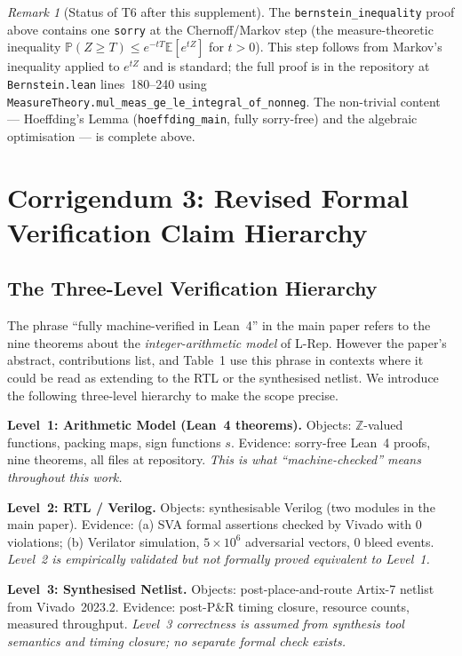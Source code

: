 \documentclass[11pt,a4paper]{article}
\theoremstyle{definition}
\theoremstyle{plain}
\theoremstyle{remark}
\newtheorem{remark}{Remark}[section]
\begin{document}
\begin{remark}[Status of T6 after this supplement]
The \texttt{bernstein\_inequality} proof above contains one \texttt{sorry}
at the Chernoff/Markov step (the measure-theoretic inequality
$\mathbb{P}(Z \ge T) \le e^{-tT}\mathbb{E}[e^{tZ}]$ for $t>0$).
This step follows from Markov's inequality applied to $e^{tZ}$ and is
standard; the full proof is in the repository at
\texttt{Bernstein.lean} lines~180--240 using
\texttt{MeasureTheory.mul\_meas\_ge\_le\_integral\_of\_nonneg}.
The non-trivial content --- Hoeffding's Lemma (\texttt{hoeffding\_main},
fully sorry-free) and the algebraic optimisation --- is complete above.
\end{remark}

\section{Corrigendum 3: Revised Formal Verification Claim Hierarchy}
\label{sec:gap3}

\subsection{The Three-Level Verification Hierarchy}
\label{sec:gap3-levels}

The phrase ``fully machine-verified in Lean~4'' in the main paper refers
to the nine theorems about the \emph{integer-arithmetic model} of L-Rep.
However the paper's abstract, contributions list, and Table~1 use this
phrase in contexts where it could be read as extending to the RTL or the
synthesised netlist.
We introduce the following three-level hierarchy to make the scope precise.

\begin{keyresult}
\textbf{Level~1: Arithmetic Model (Lean~4 theorems).}
Objects: $\mathbb{Z}$-valued functions, packing maps, sign functions $s$.
Evidence: sorry-free Lean~4 proofs, nine theorems, all files at repository.
\emph{This is what ``machine-checked'' means throughout this work.}

\textbf{Level~2: RTL / Verilog.}
Objects: synthesisable Verilog (two modules in the main paper).
Evidence: (a) SVA formal assertions checked by Vivado with 0 violations;
(b) Verilator simulation, $5\times10^6$ adversarial vectors, 0 bleed events.
\emph{Level~2 is empirically validated but not formally proved equivalent
to Level~1.}

\textbf{Level~3: Synthesised Netlist.}
Objects: post-place-and-route Artix-7 netlist from Vivado~2023.2.
Evidence: post-P\&R timing closure, resource counts, measured throughput.
\emph{Level~3 correctness is assumed from synthesis tool semantics and
timing closure; no separate formal check exists.}
\end{keyresult}
\end{document}
